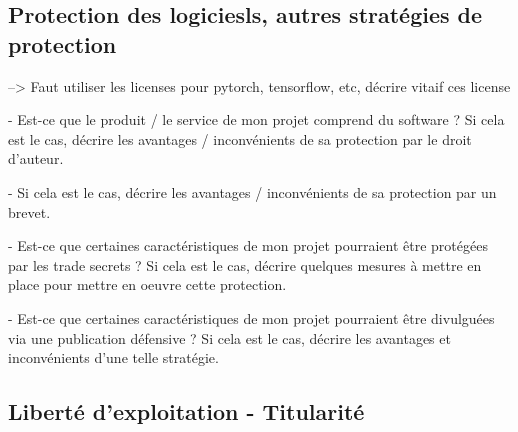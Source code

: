 %

\subsection{Protection des logiciesls, autres stratégies de protection}

--> Faut utiliser les licenses pour pytorch, tensorflow, etc, décrire vitaif ces license

- Est-ce que le produit / le service de mon projet comprend du software ? Si cela est le cas, décrire les avantages / inconvénients de sa protection par le droit d’auteur.

- Si cela est le cas, décrire les avantages / inconvénients de sa protection par un brevet.

- Est-ce que certaines caractéristiques de mon projet pourraient être protégées par les trade secrets ? Si cela est le cas, décrire quelques mesures à mettre en place pour mettre en oeuvre cette protection.

- Est-ce que certaines caractéristiques de mon projet pourraient être divulguées via une publication défensive ? Si cela est le cas, décrire les avantages et inconvénients d’une telle stratégie.

\subsection{Liberté d'exploitation - Titularité}

